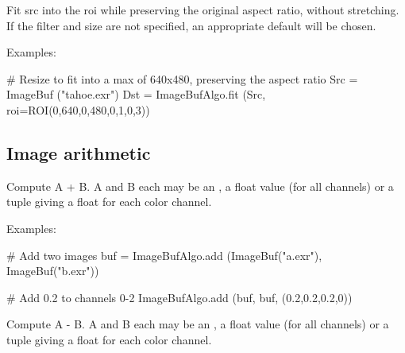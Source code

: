  
\NEW %
Fit {\cf src} into the {\cf roi} while preserving the
original aspect ratio, without stretching.  If the filter and size are not
specified, an appropriate default will be chosen.

\smallskip
\noindent Examples:
\begin{code}
    # Resize to fit into a max of 640x480, preserving the aspect ratio
    Src = ImageBuf ("tahoe.exr")
    Dst = ImageBufAlgo.fit (Src, roi=ROI(0,640,0,480,0,1,0,3))
\end{code}
\apiend



\subsection{Image arithmetic}
\label{sec:iba:py:arith}

 

Compute {\cf A + B}.  {\cf A} and {\cf B} each may
be an \ImageBuf, a {\cf float} value (for all channels) or a tuple giving a
{\cf float} for each color channel.

\smallskip
\noindent Examples:
\begin{code}
    # Add two images
    buf = ImageBufAlgo.add (ImageBuf("a.exr"), ImageBuf("b.exr"))

    # Add 0.2 to channels 0-2 
    ImageBufAlgo.add (buf, buf, (0.2,0.2,0.2,0))
\end{code}
\apiend


 

Compute {\cf A - B}.  {\cf A} and {\cf B} each may
be an \ImageBuf, a {\cf float} value (for all channels) or a tuple giving a
{\cf float} for each color channel.

